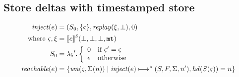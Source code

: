 \documentclass{llncs}
\newcommand{\finto}{\mathbin{\overset{\text{fin}}{\rightharpoonup}}}
\newcommand{\inject}{\mathit{inject}}
\newcommand{\setof}[1]{\{ #1 \}}
\begin{document}

\subsection{Store deltas with timestamped store}

\begin{align*}
\inject(\mexp) &=
 (S_0, \setof{\mstate},
  \replay(\msdiff,\bot), 0) \\
 \text{ where } \mstate, \msdiff &= \compile{e}^\mcntr(\bot,\bot,\bot,\kmt) \\
                S_0 &= \lambda\mstate'.
                        \left\{\begin{array}{ll}
                         0 & \text{if } \mstate' = \mstate \\
                         \epsilon & \text{otherwise}
                        \end{array}\right. \\
\mathit{reachable}(\mexp) &= \setof{\wn(\mstate,\Sigma(n)) \mid \inject(\mexp) \machstep^* (S,F,\Sigma,n'), \hd(S(\mstate)) = n}
\end{align*}
\end{document}
